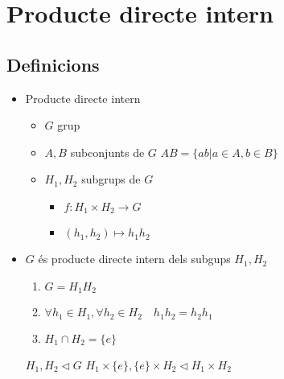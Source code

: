 \section{Producte directe intern}
\subsection*{Definicions}
\begin{itemize}
\item Producte directe intern
	\begin{itemize}
	\item $G$ grup
	\item $A, B$ subconjunts de $G$
		\subitem $AB = \{ab | a \in A, b \in B\}$
	\item $H_1, H_2$ subgrups de $G$
		\begin{itemize}
		\item $f: H_1 \times H_2 \to G$
		\item $(h_1, h_2) \mapsto h_1h_2$
		\end{itemize}
	\end{itemize}
\item $G$ és producte directe intern dels subgups $H_1, H_2$
	\begin{enumerate}
	\item $G = H_1H_2$
	\item $\forall h_1 \in H_1, \forall h_2 \in H_2 \quad h_1h_2 = h_2h_1$
	\item $H_1 \cap H_2 = \{e\}$
	\end{enumerate}
	\subitem $H_1, H_2 \lhd G$
	\subitem $H_1\times\{e\}, \{e\}\times H_2 \lhd H_1\times H_2$
\end{itemize}

